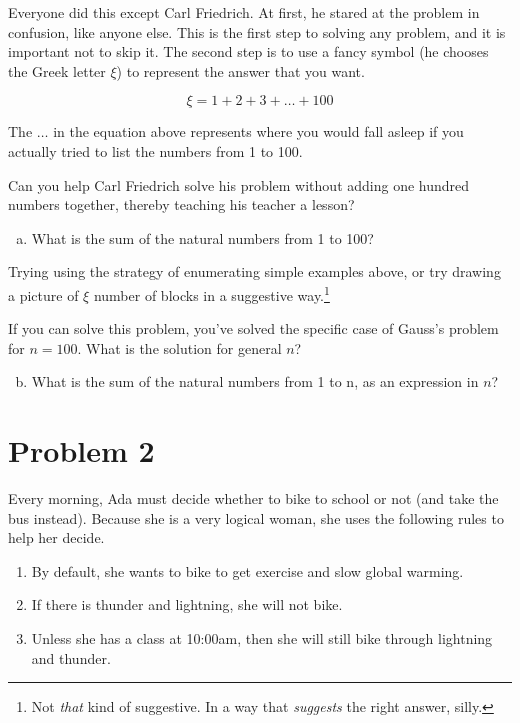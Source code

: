 \documentclass{article}
\begin{document}
Everyone did this except Carl Friedrich. At first, he stared
at the problem in confusion, like anyone else.
This is the first step to solving any problem, and it is
important not to skip it. The second step is to use a fancy
symbol (he chooses the Greek letter $\xi$) to represent the
answer that you want.

\begin{equation}
\xi = 1 + 2 + 3 + \ldots + 100
\end{equation}

The $\ldots$ in the equation above represents where you would fall
asleep if you actually tried to list the numbers from 1 to 100.

Can you help Carl Friedrich solve his problem without adding
one hundred numbers together, thereby teaching his teacher a lesson?

\begin{enumerate}[(a)]
\item
What is the sum of the natural numbers from 1 to 100?
\end{enumerate}

Trying using the strategy of enumerating simple examples above,
or try drawing a picture of $\xi$ number of blocks in a suggestive
way.\footnote{Not \emph{that} kind of suggestive. In a way that
\emph{suggests} the right answer, silly.}

If you can solve this problem, you've solved the specific case
of Gauss's problem for $n = 100$. What is the solution for
general $n$?

\begin{enumerate}[(a)]
\setcounter{enumi}{1}
\item
What is the sum of the natural numbers from 1 to n, as an expression in $n$?
\end{enumerate}

\section{Problem 2}

Every morning, Ada must decide whether to bike to school or not
(and take the bus instead).
Because she is a very logical woman,
she uses the following rules to help her decide.

\begin{enumerate}
\item
By default, she wants to bike to get exercise and slow global warming.
\item
If there is thunder and lightning, she will not bike.
\item
Unless she has a class at 10:00am, then she will still bike through
lightning and thunder.
\end{enumerate}
\end{document}
